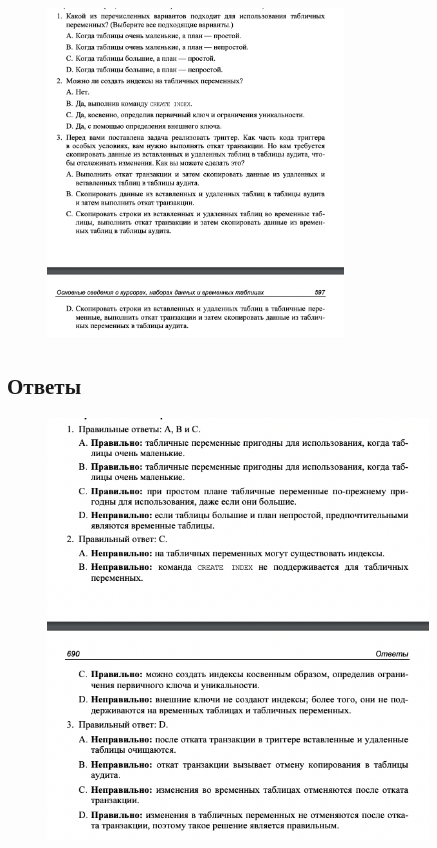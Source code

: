 \begin{figure}[h!]
	\begin{center}
		\includegraphics[width=0.7\textwidth]{img/zakrep47.png}
	\end{center}
	\captionsetup{justification=centering}
\end{figure}
\clearpage	

\subsection*{Ответы}

\begin{figure}[h!]
	\begin{center}
		\includegraphics[width=0.9\textwidth]{img/ans47.png}
	\end{center}
	\captionsetup{justification=centering}
\end{figure}

